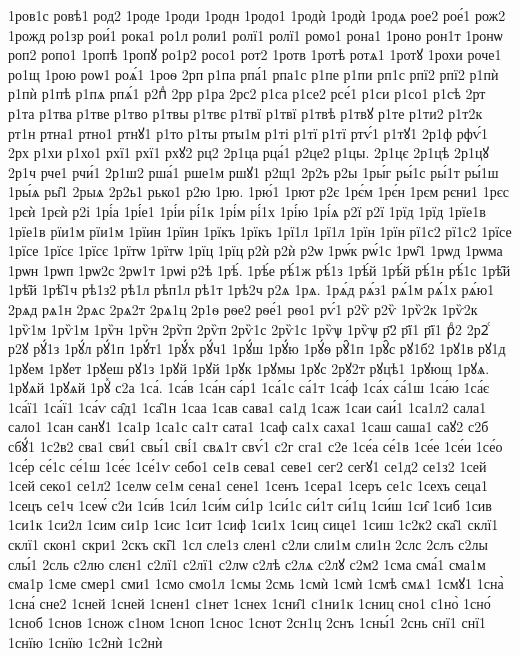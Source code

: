 {1ров1с
ровѣ1
род2
1роде
1роди
1родн
1родо1
1родѝ
1родѝ
1родѧ
рое2
рое́1
рож2
1рожд
ро1зр
рои́1
рока1
ро1л
роли1
ролї1
ролї1
ромо1
рона1
1роно
рон1т
1ронѡ
роп2
ропо1
1ропѣ
1ропꙋ
ро1р2
росо1
рот2
1ротв
1ротѣ
ротѧ1
1ротꙋ
1рохи
роче1
ро1щ
1рою
роѡ1
роѧ́1
1роѳ
2рп
р1па
рпа́1
рпа1с
р1пе
р1пи
рп1с
рпї2
рпї2
р1пѝ
р1пѝ
р1пѣ
р1пѧ
рпѧ́1
р2пⷣ
2рр
р1ра
2рс2
р1са
р1се2
рсе́1
р1си
р1со1
р1сѣ
2рт
р1та
р1тва
р1тве
р1тво
р1твы
р1твє
р1твї
р1твї
р1твѣ
р1твꙋ
р1те
р1ти2
р1т2к
рт1н
ртна1
ртно1
ртнꙋ1
р1то
р1ты
рты1м
р1ті
р1тї
р1тї
ртѵ́1
р1тꙋ1
2р1ф
рфѵ́1
2рх
р1хи
р1хо1
рхї1
рхї1
рхꙋ2
рц2
2р1ца
рца́1
р2це2
р1цы.
2р1цє
2р1цѣ
2р1цꙋ
2р1ч
рче1
рчи́1
2р1ш2
рша́1
рше1м
ршꙋ1
р2щ1
2р2ъ
р2ы
1ры́г
ры́1с
ры́1т
ры́1ш
1ры́ѧ
ры̑1
2рыѧ
2р2ь1
рько1
р2ю
1рю.
1рю́1
1рют
р2є
1рє́м
1рє́н
1рєм
рєни1
1рєс
1рєѝ
1рєѝ
р2і
1рі́а
1рі́е1
1рі́и
рі́1к
1рі́м
рі́1х
1рі́ю
1рі́ѧ
р2ї
р2ї
1рїд
1рїд
1рїе1в
1рїе1в
рїи1м
рїи1м
1рїин
1рїин
1рїкъ
1рїкъ
1рї1л
1рї1л
1рїн
1рїн
рї1с2
рї1с2
1рїсе
1рїсе
1рїсє
1рїсє
1рїтѡ
1рїтѡ
1рїц
1рїц
р2ѝ
р2ѝ
р2ѡ
1рѡ́к
рѡ́1с
1рѡ̑1
1рѡд
1рѡма
1рѡн
1рѡп
1рѡ2с
2рѡ1т
1рѡі
р2ѣ
1рѣ́.
1рѣ́е
рѣ́1ж
рѣ́1з
1рѣ́й
1рѣ́й
рѣ́1н
рѣ́1с
1рѣ̑й
1рѣ̑й
1рѣ̑1ч
рѣ1з2
рѣ1л
рѣп1л
рѣ1т
1рѣ2ч
р2ѧ
1рѧ.
1рѧ́д
рѧ́з1
рѧ́1м
рѧ́1х
рѧ́ю1
2рѧд
рѧ1н
2рѧс
2рѧ2т
2рѧ1ц
2р1ѳ
рѳе2
рѳе́1
рѳо1
рѵ́1
р2ѷ
р2ѷ
1рѷ2к
1рѷ2к
1рѷ1м
1рѷ1м
1рѷн
1рѷн
2рѷп
2рѷп
2рѷ1с
2рѷ1с
1рѷѱ
1рѷѱ
р҃2
р҃ї1
р҃ї1
рⷣ2
2р2ⷭ
р2ꙋ
рꙋ́1з
1рꙋ́л
рꙋ́1п
1рꙋ́т1
1рꙋ́х
рꙋ́ч1
1рꙋ́ш
1рꙋ́ю
1рꙋ́ѳ
рꙋ̑1п
1рꙋ̑с
рꙋ1б2
1рꙋ1в
рꙋ1д
1рꙋем
1рꙋет
1рꙋеш
рꙋ1з
1рꙋй
1рꙋй
1рꙋк
1рꙋмы
1рꙋс
2рꙋ2т
рꙋцѣ1
1рꙋющ
1рꙋѧ.
1рꙋѧй
1рꙋѧй
1рꙋⷯ
с2а
1са́.
1са́в
1са́н
са́р1
1са́1с
са́1т
1са́ф
1са́х
са́1ш
1са́ю
1са́є
1са́ї1
1са́ї1
1са́ѵ
са̑д1
1са̑1н
1саа
1сав
сава1
са1д
1саж
1саи
саи́1
1са1л2
сала1
сало1
1сан
санꙋ1
1са1р
1са1с
са1т
сата1
1саф
са1х
саха1
1саш
саша1
саꙋ2
с2б
сбꙋ́1
1с2в2
сва1
сви́1
свы́1
сві́1
свѧ1т
свѵ́1
с2г
сга1
с2е
1се́а
се́1в
1се́е
1се́и
1се́о
1се́р
се́1с
се́1ш
1се́є
1се́1ѵ
себо1
се1в
сева1
севе1
сег2
сегꙋ1
се1д2
се1з2
1сей
1сей
секо1
се1л2
1селѡ
се1м
сена1
сене1
1сенъ
1сера1
1серъ
се1с
1сехъ
сеца1
1сецъ
се1ч
1сеѡ́
с2и
1си́в
1си́л
1си́м
си́1р
1си́1с
си́1т
си́1ц
1си́ш
1си̑
1сиб
1сив
1си1к
1си2л
1сим
си1р
1сис
1сит
1сиф
1си1х
1сиц
сице1
1сиш
1с2к2
ска̑1
склї1
склї1
скон1
скри1
2скъ
скі̑1
1сл
сле1з
слен1
с2ли
сли1м
сли1н
2слс
2слъ
с2лы
слы́1
2сль
с2лю
слєн1
с2лї1
с2лї1
с2лѡ
с2лѣ
с2лѧ
с2лꙋ
с2м2
1сма
сма́1
сма1м
сма1р
1сме
смер1
сми1
1смо
смо1л
1смы
2смь
1смѝ
1смѝ
1смѣ
смѧ1
1смꙋ1
1сна̀
1сна́
сне2
1сней
1сней
1снен1
с1нет
1снех
1сни̑1
с1ни1к
1сниц
сно1
с1но̀
1сно́
1сноб
1снов
1снож
с1ном
1сноп
1снос
1снот
2сн1ц
2снъ
1сны́1
2снь
снї1
снї1
1снїю
1снїю
1с2нѝ
1с2нѝ
}
